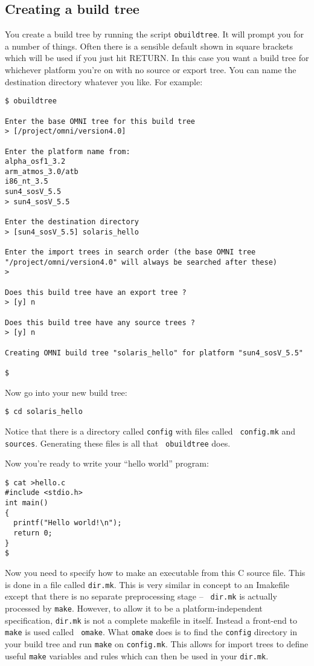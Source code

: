 \documentclass[11pt]{article}
\begin{document}
\subsection{Creating a build tree}

You create a build tree by running the script {\tt obuildtree}.  It will prompt
you for a number of things.  Often there is a sensible default shown in square
brackets which will be used if you just hit RETURN.  In this case you want a
build tree for whichever platform you're on with no source or export tree.  You
can name the destination directory whatever you like.  For example:

\begin{verbatim}
$ obuildtree

Enter the base OMNI tree for this build tree
> [/project/omni/version4.0] 

Enter the platform name from:
alpha_osf1_3.2
arm_atmos_3.0/atb
i86_nt_3.5
sun4_sosV_5.5
> sun4_sosV_5.5

Enter the destination directory
> [sun4_sosV_5.5] solaris_hello

Enter the import trees in search order (the base OMNI tree
"/project/omni/version4.0" will always be searched after these)
> 

Does this build tree have an export tree ?
> [y] n

Does this build tree have any source trees ?
> [y] n

Creating OMNI build tree "solaris_hello" for platform "sun4_sosV_5.5"

$
\end{verbatim}

Now go into your new build tree:

\begin{verbatim}
$ cd solaris_hello
\end{verbatim}

Notice that there is a directory called {\tt config} with files called {\tt
config.mk} and {\tt sources}.  Generating these files is all that {\tt
obuildtree} does.

Now you're ready to write your ``hello world'' program:

\begin{verbatim}
$ cat >hello.c
#include <stdio.h>
int main()
{
  printf("Hello world!\n");
  return 0;
}
$
\end{verbatim}

Now you need to specify how to make an executable from this C source file.
This is done in a file called {\tt dir.mk}.  This is very similar in concept to
an Imakefile except that there is no separate preprocessing stage -- {\tt
dir.mk} is actually processed by {\tt make}.  However, to allow it to be a
platform-independent specification, {\tt dir.mk} is not a complete
makefile in itself.  Instead a front-end to {\tt make} is used called {\tt
omake}.  What {\tt omake} does is to find the {\tt config} directory in your
build tree and run {\tt make} on {\tt config.mk}.  This allows for import trees
to define useful {\tt make} variables and rules which can then be used in your
{\tt dir.mk}.
\end{document}
